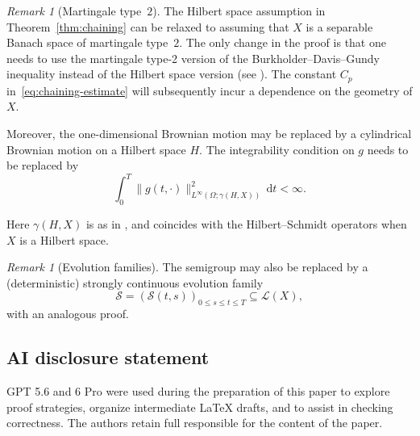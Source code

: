 \documentclass[11pt]{amsart}
\theoremstyle{definition}
\theoremstyle{remark}
\newtheorem{remark}[theorem]{Remark}
\numberwithin{equation}{section}
\newcommand{\1}{\mathbf 1}
\newcommand{\dd}{\,\mathrm d}
\begin{document}
\begin{remark}[Martingale type~\(2\)]
The Hilbert space assumption in Theorem~\ref{thm:chaining} can be
relaxed to assuming that \(X\) is a separable Banach space of
martingale type~\(2\). 
The only change in the proof is that one needs to use the martingale type-2 version of the Burkholder--Davis--Gundy inequality instead of the Hilbert space version (see \cite{Sei10}).
The constant $C_p$ in~\eqref{eq:chaining-estimate} will subsequently incur a dependence on the geometry of $X$. 

Moreover, the one-dimensional Brownian motion may be replaced by a cylindrical Brownian motion on a Hilbert space $H$. The integrability condition on $g$ needs to be replaced by 
\[\int_0^T \|g(t,\cdot)\|_{L^\infty(\Omega;\gamma(H,X))}^2 \dd t<\infty.\]

Here $\gamma(H,X)$ is as in \cite[Chapter 9]{HNVW2017}, and coincides with the Hilbert--Schmidt operators when $X$ is a Hilbert space. 
\end{remark}

\begin{remark}[Evolution families]
The semigroup may also be replaced by a (deterministic) strongly continuous evolution family
\[
 \mathscr S=(\mathscr S(t,s))_{0\leq s\leq t\leq T}
 \subseteq\mathcal L(X),
\]
with an analogous proof.
\end{remark}


\subsection*{AI disclosure statement}
GPT 5.6 and 6 Pro were used during the preparation of this paper to explore proof strategies, organize intermediate {\LaTeX} drafts, and to assist in checking correctness. The authors retain full responsible for the content of the paper.




\end{document}
